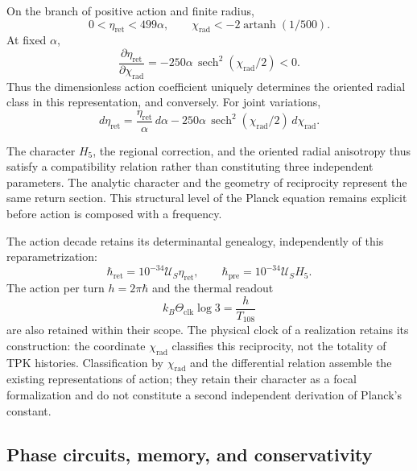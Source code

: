 On the branch of positive action and finite radius,
\begin{equation}
 0<\eta_{\mathrm{ret}}<499\alpha,\qquad
 \chi_{\mathrm{rad}}
 <-2\operatorname{artanh}(1/500).
 \label{md:restop:dominio-positivo}
\end{equation}
At fixed $\alpha$,
\begin{equation}
 \frac{\partial\eta_{\mathrm{ret}}}{\partial\chi_{\mathrm{rad}}}
 =-250\alpha\,\operatorname{sech}^2(\chi_{\mathrm{rad}}/2)<0.
 \label{md:restop:derivada-accion}
\end{equation}
Thus the dimensionless action coefficient uniquely determines the
oriented radial class in this representation, and conversely.
For joint variations,
\begin{equation}
 d\eta_{\mathrm{ret}}
 =\frac{\eta_{\mathrm{ret}}}{\alpha}\,d\alpha
 -250\alpha\,\operatorname{sech}^2(\chi_{\mathrm{rad}}/2)
 \,d\chi_{\mathrm{rad}}.
 \label{md:restop:diferencial-accion}
\end{equation}

The character $H_5$, the regional correction, and the oriented radial anisotropy
thus satisfy a compatibility relation rather than constituting three
independent parameters. The analytic character and the geometry of
reciprocity represent the same return section.
This structural level of the Planck equation remains explicit
before action is composed with a frequency.

The action decade retains its determinantal genealogy, independently
of this reparametrization:
\begin{equation}
 \hbar_{\mathrm{ret}}
 =10^{-34}\mathcal U_S\eta_{\mathrm{ret}},\qquad
 \hbar_{\mathrm{pre}}=10^{-34}\mathcal U_SH_5.
 \label{md:restop:secciones-accion}
\end{equation}
The action per turn $h=2\pi\hbar$ and the thermal readout
\begin{equation}
 k_B\Theta_{\mathrm{clk}}\log3=\frac{h}{T_{108}}
 \label{md:restop:lectura-termica}
\end{equation}
are also retained within their scope. The physical clock of a realization retains its construction:
the coordinate $\chi_{\mathrm{rad}}$ classifies this reciprocity, not
the totality of TPK histories. Classification by
$\chi_{\mathrm{rad}}$ and the differential relation assemble the existing
representations of action; they retain their character as a focal formalization and do
not constitute a second independent derivation of Planck's constant.

\subsection{Phase circuits, memory, and conservativity}
\label{md:restop:conservatividad}

